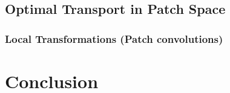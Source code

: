 \documentclass[
     12pt,         %
     a4paper,      %
     BCOR=10mm,     %
     DIV=14,        %
     ]{scrreprt}
\begin{document}

\section{Optimal Transport in Patch Space}
\subsection{Local Transformations (Patch convolutions)}


\chapter{Conclusion}
\end{document}
